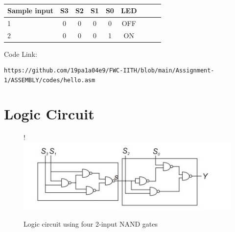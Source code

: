 \documentclass[10pt, a4paper]{article}
\begin{document}
\begin{table}[htbp]
 \begin{center}
    \begin{tabular}{|l|c|c|c|c|c|c|c|c} \hline \textbf{Sample input}
  & \textbf{S3} & \textbf{S2} & \textbf{S1}& \textbf{S0}& \textbf{LED } \\
 \hline
1&0&0&0&0&OFF\\ \hline
2&0&0&0&1&ON \\ \hline
\end{tabular}   
\end{center}
\caption{\label{table:dummytable} }
\end{table}
\vspace{3mm}
Code Link:
\begin{lstlisting}
https://github.com/19pa1a04e9/FWC-IITH/blob/main/Assignment-1/ASSEMBLY/codes/hello.asm
\end{lstlisting}
\pagebreak

\section{Logic Circuit}
\begin{figure}[!h]
\resizebox {\columnwidth} {!} {
\includegraphics[width=1\columnwidth]{Logic Circuit.jpg}
}
\caption{Logic circuit using four 2-input NAND gates}

\end{figure}
\end{document}
